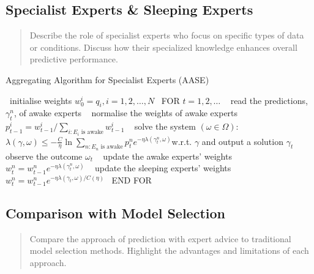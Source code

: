 \documentclass[11pt]{article} %
\theoremstyle{plain}
\theoremstyle{definition}
\begin{document}
\subsection{Specialist Experts \& Sleeping Experts}
\begin{quote}
  Describe the role of specialist experts who focus on specific types of data or conditions. Discuss how their specialized knowledge enhances overall predictive performance.
\end{quote}

\begin{algorithm}
  \caption{Aggregating Algorithm for Specialist Experts (AASE)}\label{AAS}
  \begin{algorithmic}[1]
    \State\ initialise weights $w^i_0 = q_i, i = 1, 2, \ldots, N$
    \State\ FOR $t = 1, 2, \ldots$
    \State\ \hspace{\algorithmicindent} read the predictions, $\gamma^n_t$, of awake experts
    \State\ \hspace{\algorithmicindent} normalise the weights of awake experts\newline\hspace*{\algorithmicindent}\hspace{\algorithmicindent} $p^i_{t-1} = w^i_{t-1} / \sum_{i:E_i\text{ is awake}} w^i_{t-1}$
    \State\ \hspace{\algorithmicindent} solve the system $(\omega \in \Omega)$:\newline\hspace*{\algorithmicindent}\hspace{\algorithmicindent}$\lambda(\gamma, \omega) \leq - \frac{C}{\eta} \ln \sum_{n:E_n\text{ is awake}}p^n_{t}e^{-\eta\lambda(\gamma^n_t, \omega)}$\newline\hspace*{\algorithmicindent}\hspace{\algorithmicindent}w.r.t. $\gamma$ and output a solution $\gamma_t$
    \State\ \hspace{\algorithmicindent} observe the outcome $\omega_t$
    \State\ \hspace{\algorithmicindent} update the awake experts' weights $w^n_t = w^n_{t-1}e^{-\eta\lambda(\gamma^n_t,\omega)}$
    \State\ \hspace{\algorithmicindent} update the sleeping experts' weights $w^n_t = w^n_{t-1} e^{-\eta\lambda(\gamma_t, \omega)/C(\eta)}$
    \State\ END FOR
  \end{algorithmic}
\end{algorithm}


\subsection{Comparison with Model Selection}
\begin{quote}
  Compare the approach of prediction with expert advice to traditional model selection methods. Highlight the advantages and limitations of each approach.
\end{quote}

\newpage



\end{document}

